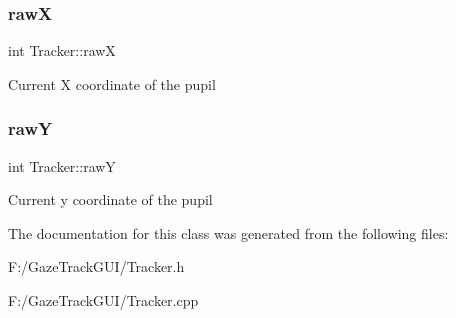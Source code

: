 \subsubsection{\texorpdfstring{rawX}{rawX}}
{\footnotesize\ttfamily int Tracker\+::rawX\hspace{0.3cm}{\ttfamily [private]}}

Current X coordinate of the pupil \mbox{\label{class_tracker_a5d10e475635c7cfb3063ded1f85734c0}} 
\subsubsection{\texorpdfstring{rawY}{rawY}}
{\footnotesize\ttfamily int Tracker\+::rawY\hspace{0.3cm}{\ttfamily [private]}}

Current y coordinate of the pupil 

The documentation for this class was generated from the following files\+:\begin{DoxyCompactItemize}
\item 
F\+:/\+Gaze\+Track\+G\+U\+I/Tracker.\+h\item 
F\+:/\+Gaze\+Track\+G\+U\+I/Tracker.\+cpp\end{DoxyCompactItemize}

